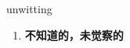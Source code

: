 
\begin{frame}
{\huge unwitting}
\begin{center}
\begin{enumerate}\Large
  \item \textbf{不知道的，未觉察的}
\end{enumerate}
\end{center}
\end{frame}

